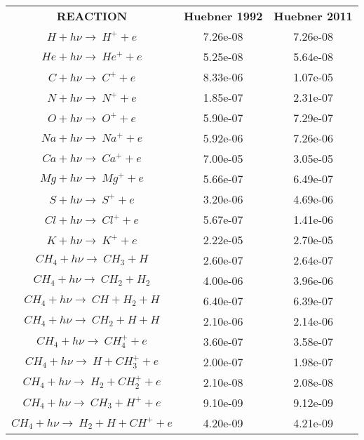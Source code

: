 \documentclass[11pt]{article}
\begin{document}
\begin{tabular}{ccc}
\textbf{REACTION} & \textbf{Huebner 1992} & \textbf{Huebner 2011} \\
$H + h\nu \rightarrow\ H^+ + e$  &   7.26e-08 &   7.26e-08 \\
\color{blue} $He + h\nu \rightarrow\ He^+ + e$  & \color{blue}  5.25e-08 & \color{blue}  5.64e-08 \\
\color{blue} $C + h\nu \rightarrow\ C^+ + e$  & \color{blue}  8.33e-06 & \color{blue}  1.07e-05 \\
\color{blue} $N + h\nu \rightarrow\ N^+ + e$  & \color{blue}  1.85e-07 & \color{blue}  2.31e-07 \\
\color{blue} $O + h\nu \rightarrow\ O^+ + e$  & \color{blue}  5.90e-07 & \color{blue}  7.29e-07 \\
\color{blue} $Na + h\nu \rightarrow\ Na^+ + e$  & \color{blue}  5.92e-06 &  \color{blue} 7.26e-06 \\
\color{blue} $Ca + h\nu \rightarrow\ Ca^+ + e$  & \color{blue}  7.00e-05 & \color{blue}  3.05e-05 \\
\color{blue} $Mg + h\nu \rightarrow\ Mg^+ + e$  & \color{blue}  5.66e-07 & \color{blue}  6.49e-07 \\
\color{blue} $S + h\nu \rightarrow\ S^+ + e$  & \color{blue}  3.20e-06 & \color{blue}  4.69e-06 \\
\color{blue} $Cl + h\nu \rightarrow\ Cl^+ + e$  & \color{blue}  5.67e-07 & \color{blue}  1.41e-06 \\
\color{blue} $K + h\nu \rightarrow\ K^+ + e$  & \color{blue}  2.22e-05 & \color{blue}  2.70e-05 \\
 $CH_4 + h\nu \rightarrow\ CH_3 + H$  &   2.60e-07 &   2.64e-07 \\
 $CH_4 + h\nu \rightarrow\ CH_2 + H_2$  &   4.00e-06 &   3.96e-06 \\
 $CH_4 + h\nu \rightarrow\ CH + H_2 + H$  &   6.40e-07 &   6.39e-07 \\
 $CH_4 + h\nu \rightarrow\ CH_2 + H + H$  &   2.10e-06 &   2.14e-06 \\
 $CH_4 + h\nu \rightarrow\ CH_4^+ + e$  &   3.60e-07 &   3.58e-07 \\
 $CH_4 + h\nu \rightarrow\ H + CH_3^+ + e$  &   2.00e-07 &   1.98e-07 \\
 $CH_4 + h\nu \rightarrow\ H_2 + CH_2^+ + e$  &   2.10e-08 &   2.08e-08 \\
 $CH_4 + h\nu \rightarrow\ CH_3 + H^+ + e$  &   9.10e-09 &   9.12e-09 \\
 $CH_4 + h\nu \rightarrow\ H_2 + H + CH^+ + e$  &   4.20e-09 &   4.21e-09 \\

\end{tabular}
\end{document}
